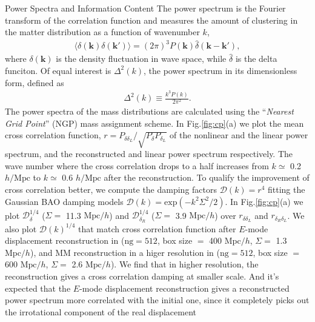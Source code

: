 \begin{section}{Power Spectra and Information Content}
  \label{sec:fisherinfo}
The power spectrum is the Fourier transform of the correlation function and measures 
the amount of clustering in the matter distribution as a function of wavenumber $k$,
\begin{align}
    \langle \delta \left( \bm{k} \right) \delta \left( \bm{k'}\right) \rangle =
\left( 2\pi \right) ^3 P \left( \bm{k} \right) \hat{\delta} \left( \bm{k}-\bm{k'} \right),
\end{align}
where $\delta \left( \bm{k} \right)$ is the density fluctuation in wave space, while 
$\hat{\delta}$ is the delta funciton. Of equal interest is $\Delta ^2(k)$, the power 
spectrum in its dimensionless form, defined as
\begin{align}
    \Delta ^2(k) \equiv \frac{k^3 P \left( k \right)}{2\pi ^2}.
\end{align}
    The power spectra of the mass distributions are calculated using the 
\enquote{\textit{Nearest Grid Point}} (NGP) mass assignment scheme. 
In Fig.\ref{fig:cp}(a) we plot the mean cross correlation function, 
$r=P_{\delta \delta_L}/\sqrt{P_\delta P_{\delta_L}}$ of the nonlinear and the 
linear power spectrum, and the reconstructed and linear power spectrum respectively. 
The wave number where the cross correlation drops to a half increases 
from $k\simeq$ 0.2 $h/\mathrm{Mpc}$ to $k \simeq$ 0.6 $h/\mathrm{Mpc}$ after 
the reconstruction. 
To qualify the improvement of cross correlation better, 
we compute the damping factors $\mathcal{D}(k)=r^4$ fitting the Gaussian BAO 
damping models $\mathcal{D}(k)=\mathrm{exp}(-k^2 \Sigma^2/2)$. 
In Fig.\ref{fig:cp}(a) we plot $\mathcal{D}_\delta^{1/4}$ 
($\Sigma =$ 11.3 $\mathrm{Mpc}/h$) and $\mathcal{D}_{\delta_R}^{1/4}$ 
($\Sigma = $ 3.9 $\mathrm{Mpc}/h$) over $r_{\delta\delta_L}$ and $r_{\delta_R\delta_L}$. 
We also plot $\mathcal{D}(k)^{1/4}$ that match cross correlation function after 
$E$-mode displacement reconstruction in \cite{bib:Yu2016} ($\mathrm{ng}=512$, 
box size $=$ 400 $\mathrm{Mpc}/h$, $\Sigma =$ 1.3 $\mathrm{Mpc}/h$), and 
MM reconstruction in a higer resolution in \cite{bib:ZhuH2016} ($\mathrm{ng}=512$, 
box size $=$ 600 $\mathrm{Mpc}/h$, $\Sigma =$ 2.6 $\mathrm{Mpc}/h$). 
We find that in higher resolution, the reconstruction gives a cross correlation 
damping at smaller scale. 
And it's expected that the $E$-mode displacement reconstruction gives a 
reconstructed power spectrum more correlated with the initial one, since 
it completely picks out the irrotational component of the real displacement 

\end{section}
